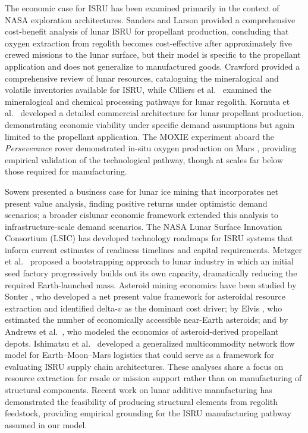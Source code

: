 \documentclass[preprint,12pt]{elsarticle}
\begin{document}
The economic case for ISRU has been examined primarily in the context of NASA exploration architectures. Sanders and Larson \cite{sanders2015} provided a comprehensive cost-benefit analysis of lunar ISRU for propellant production, concluding that oxygen extraction from regolith becomes cost-effective after approximately five crewed missions to the lunar surface, but their model is specific to the propellant application and does not generalize to manufactured goods. Crawford \cite{crawford2015} provided a comprehensive review of lunar resources, cataloguing the mineralogical and volatile inventories available for ISRU, while Cilliers et al.\ \cite{cilliers2023} examined the mineralogical and chemical processing pathways for lunar regolith. Kornuta et al.\ \cite{kornuta2019} developed a detailed commercial architecture for lunar propellant production, demonstrating economic viability under specific demand assumptions but again limited to the propellant application. The MOXIE experiment aboard the \textit{Perseverance} rover demonstrated in-situ oxygen production on Mars \cite{hecht2021}, providing empirical validation of the technological pathway, though at scales far below those required for manufacturing.

Sowers \cite{sowers2021} presented a business case for lunar ice mining that incorporates net present value analysis, finding positive returns under optimistic demand scenarios; a broader cislunar economic framework \cite{sowers2023} extended this analysis to infrastructure-scale demand scenarios. The NASA Lunar Surface Innovation Consortium (LSIC) \cite{lsic2021} has developed technology roadmaps for ISRU systems that inform current estimates of readiness timelines and capital requirements. Metzger et al.\ \cite{metzger2013} proposed a bootstrapping approach to lunar industry in which an initial seed factory progressively builds out its own capacity, dramatically reducing the required Earth-launched mass. Asteroid mining economics have been studied by Sonter \cite{sonter1997}, who developed a net present value framework for asteroidal resource extraction and identified delta-$v$ as the dominant cost driver; by Elvis \cite{elvis2012}, who estimated the number of economically accessible near-Earth asteroids; and by Andrews et al.\ \cite{andrews2015}, who modeled the economics of asteroid-derived propellant depots. Ishimatsu et al.\ \cite{ishimatsu2016} developed a generalized multicommodity network flow model for Earth--Moon--Mars logistics that could serve as a framework for evaluating ISRU supply chain architectures. These analyses share a focus on resource extraction for resale or mission support rather than on manufacturing of structural components. Recent work on lunar additive manufacturing \cite{werkheiser2015,cesaretti2014} has demonstrated the feasibility of producing structural elements from regolith feedstock, providing empirical grounding for the ISRU manufacturing pathway assumed in our model.
\end{document}
